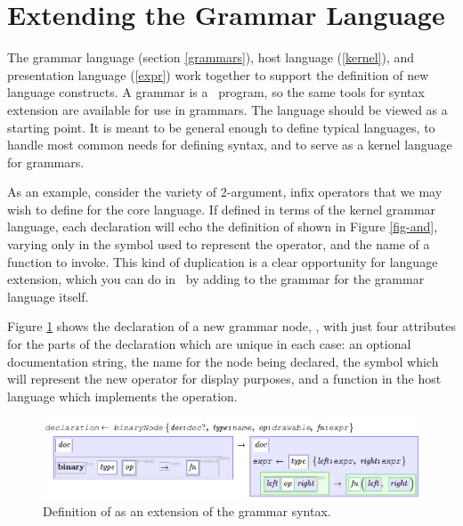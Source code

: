 \section{Extending the Grammar Language}
The grammar language (section \ref{grammars}), host language (\ref{kernel}), and presentation language (\ref{expr}) work together to support the definition of new language constructs.
A grammar is a \Meta\ program, so the same tools for syntax extension are available for use in grammars. The  language should be viewed as a starting point. It is meant to be general enough to define typical languages, to handle most common needs for defining syntax, and to serve as a kernel language for grammars.

As an example, consider the variety of 2-argument, infix operators that we may wish to define for the core language. If defined in terms of the kernel grammar language, each declaration will echo the definition of  shown in Figure \ref{fig-and}, varying only in the symbol used to represent the operator, and the name of a function to invoke. This kind of duplication is a clear opportunity for language extension, which you can do in \Meta\ by adding to the grammar for the grammar language itself. 

Figure \ref{fig-binary} shows the declaration of a new grammar node, , with just four attributes for the parts of the declaration which are unique in each case: an optional documentation string, the name for the node being declared, the symbol which will represent the new operator for display purposes, and a function in the host language which implements the operation.

\begin{figure}[t]
	\centering
	\includegraphics[scale=0.8]{src/image/binaryNode.pdf}

	\caption{Definition of  as an extension of the grammar syntax.}
	\label{fig-binary}
\end{figure}

